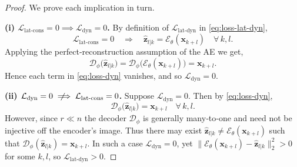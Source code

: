 \documentclass{article}
\newcommand{\notimplies}{%
  \mathrel{{\ooalign{\hidewidth$\not\phantom{=}$\hidewidth\cr$\implies$}}}}
\begin{document}
\begin{proof}
We prove each implication in turn.

\medskip\noindent\textbf{(i) \(\mathcal{L}_{\mathrm{lat\text{-}cons}}=0\implies\mathcal{L}_{\mathrm{dyn}}=0\).}
By definition of \(\mathcal{L}_{\mathrm{lat\text{-}dyn}}\) in \eqref{eq:loss-lat-dyn},  
\[
\mathcal{L}_{\mathrm{lat\text{-}cons}}=0
\quad\Longrightarrow\quad
\hat{\mathbf{z}}_{l|k}
=\mathcal{E}_\theta(\mathbf{x}_{k+l})
\quad\forall\,k,l.
\]
Applying the perfect‐reconstruction assumption of the AE we get,
\[
\mathcal{D}_\phi\bigl(\hat{\mathbf{z}}_{l|k}\bigr)
=\mathcal{D}_\phi\bigl(\mathcal{E}_\theta(\mathbf{x}_{k+l})\bigr)
=\mathbf{x}_{k+l}.
\]
Hence each term in \eqref{eq:loss-dyn} vanishes, and so \(\mathcal{L}_{\mathrm{dyn}}=0\).

\medskip\noindent\textbf{(ii) \(\mathcal{L}_{\mathrm{dyn}}=0\notimplies\mathcal{L}_{\mathrm{lat\text{-}cons}}=0\).} 
Suppose \(\mathcal{L}_{\mathrm{dyn}}=0\).  Then by \eqref{eq:loss-dyn},
\[
\mathcal{D}_\phi\bigl(\hat{\mathbf{z}}_{l|k}\bigr)
=\mathbf{x}_{k+l}
\quad\forall\,k,l.
\]
However, since \(r\ll n\) the decoder \(\mathcal{D}_\phi\) is generally many‑to‑one and need not be injective off the encoder’s image.  Thus there may exist
\(\hat{\mathbf{z}}_{l|k}\neq\mathcal{E}_\theta(\mathbf{x}_{k+l})\)
such that
\(\mathcal{D}_\phi(\hat{\mathbf{z}}_{l|k})=\mathbf{x}_{k+l}\).
In such a case \(\mathcal{L}_{\mathrm{dyn}}=0\), yet
\(\|\mathcal{E}_\theta(\mathbf{x}_{k+l})-\hat{\mathbf{z}}_{l|k}\|_2^2>0\)
for some \(k,l\), so \(\mathcal{L}_{\mathrm{lat\text{-}dyn}}>0\).
\end{proof}
\end{document}
